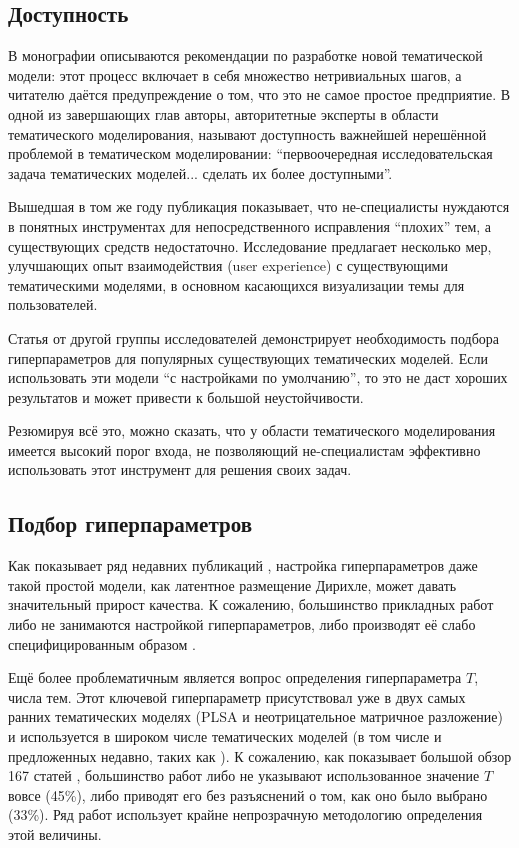 \subsection{Доступность}

В монографии \cite{fntir2017applications} описываются рекомендации по разработке новой тематической модели: этот процесс включает в себя множество нетривиальных шагов, а читателю даётся предупреждение о том, что это не самое простое предприятие. В одной из завершающих глав авторы, авторитетные эксперты в области тематического моделирования, называют доступность важнейшей нерешённой проблемой в тематическом моделировании: ``первоочередная исследовательская задача тематических моделей... сделать их более доступными''.

Вышедшая в том же году публикация \cite{lee2017human} показывает, что не-специалисты нуждаются в понятных инструментах для непосредственного исправления ``плохих'' тем, а существующих средств недостаточно. Исследование предлагает несколько мер, улучшающих опыт взаимодействия (user experience) с существующими тематическими моделями, в основном касающихся визуализации темы для пользователей.

Статья от другой группы исследователей \cite{agrawal2018wrong} демонстрирует необходимость подбора гиперпараметров для популярных существующих тематических моделей. Если использовать эти модели ``с настройками по умолчанию'', то это не даст хороших результатов и может привести к большой неустойчивости.

Резюмируя всё это, можно сказать, что у области тематического моделирования имеется высокий порог входа, не позволяющий не-специалистам эффективно использовать этот инструмент для решения своих задач.

\subsection{Подбор гиперпараметров}

Как показывает ряд недавних публикаций \cite{agrawal2018wrong,fan2019assessing}, настройка гиперпараметров даже такой простой модели, как латентное размещение Дирихле, может давать значительный прирост качества. К сожалению, большинство прикладных работ либо не занимаются настройкой гиперпараметров, либо производят её слабо специфицированным образом \cite{agrawal2018wrong}.

Ещё более проблематичным является вопрос определения гиперпараметра $T$, числа тем. Этот ключевой гиперпараметр присутствовал уже в двух самых ранних тематических моделях (PLSA и неотрицательное матричное разложение) и используется в широком числе тематических моделей (в том числе и предложенных недавно, таких как \cite{zosa-granroth-wilding-2019-multilingual}). К сожалению, как показывает большой обзор 167 статей \cite{chen2016survey}, большинство работ либо не указывают использованное значение $T$ вовсе (45\%), либо приводят его без разъяснений о том, как оно было выбрано (33\%). Ряд работ использует крайне непрозрачную методологию определения этой величины.

